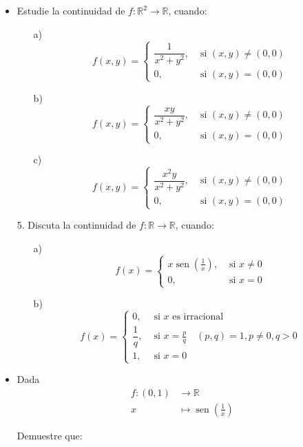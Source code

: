 \begin{itemize}
\item Estudie la continuidad de $f: \mathbb{R}^2 \rightarrow \mathbb{R}$, cuando:\\

\begin{itemize}
    \item[a)]
$$
f(x, y)= \begin{cases}\dfrac{1}{x^2+y^2}, & \text { si }(x, y) \neq(0,0) \\ 0, & \text { si }(x, y)=(0,0)\end{cases}
$$
\item[b)]
$$
f(x, y)= \begin{cases}\dfrac{x y}{x^2+y^2}, & \text { si }(x, y) \neq(0,0) \\ 0, & \text { si }(x, y)=(0,0)\end{cases}
$$
\item [c)]
$$
f(x, y)= \begin{cases}\dfrac{x^2 y}{x^2+y^2}, & \text { si }(x, y) \neq(0,0) \\ 0, & \text { si }(x, y)=(0,0)\end{cases}
$$
\end{itemize}

5. Discuta la continuidad de $f: \mathbb{R} \rightarrow \mathbb{R}$, cuando:

\begin{itemize}
    \item[a)]
$$
f(x)= \begin{cases}x \operatorname{sen}\left(\frac{1}{x}\right), & \text { si } x \neq 0 \\ 0, & \text { si } x=0\end{cases}
$$
\item[b)]
$$
f(x)= \begin{cases}0, & \text { si } x \text { es irracional } \\ \dfrac{1}{q}, & \text { si } x=\frac{p}{q} \quad(p, q)=1, p \neq 0, q>0 \\ 1, & \text { si } x=0\end{cases}
$$
\end{itemize}

\item Dada
$$
\begin{aligned}
f:(0,1) & \rightarrow \mathbb{R} \\
x & \mapsto \operatorname{sen}\left(\frac{1}{x}\right)
\end{aligned}
$$

Demuestre que:


\end{itemize}
